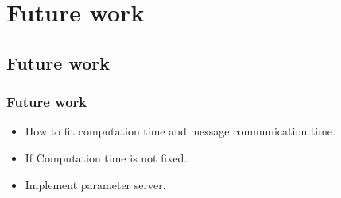 \section{Future work}

\subsection{Future work}
\begin{frame}
    \frametitle{Future work}
	\begin{itemize}
		\item How to fit computation time and message communication time. 
		\item If Computation time is not fixed. 
		\item Implement parameter server. 
	\end{itemize}
\end{frame}



